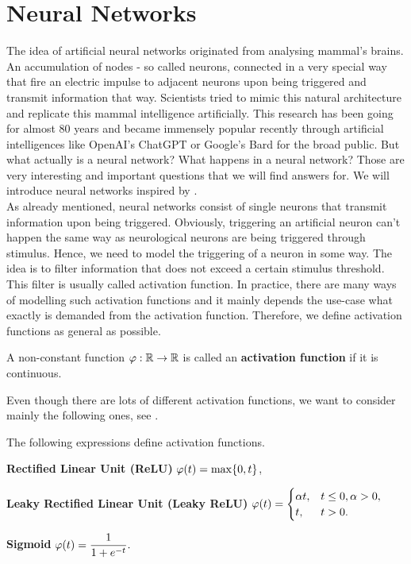 \section{Neural Networks}\label{sec:nn}
The idea of artificial neural networks originated from analysing mammal's brains. An accumulation of nodes - so called neurons, connected in a very special way that fire an electric impulse to adjacent neurons upon being triggered and transmit information that way. Scientists tried to mimic this natural architecture and replicate this mammal intelligence artificially. This research has been going for almost 80 years and became immensely popular recently through artificial intelligences like OpenAI's ChatGPT or Google's Bard for the broad public. But what actually is a neural network? What happens in a neural network? Those are very interesting and important questions that we will find answers for. We will introduce neural networks inspired by \cite[Chapter~3]{mucke2019empirical}.\\
 As already mentioned, neural networks consist of single neurons that transmit information upon being \glqq triggered\grqq{}. Obviously, triggering an artificial neuron can't happen the same way as neurological neurons are being triggered through stimulus. Hence, we need to model the triggering of a neuron in some way. The idea is to filter information that does not exceed a certain stimulus threshold. This filter is usually called activation function. In practice, there are many ways of modelling such activation functions and it mainly depends the use-case what exactly is demanded from the activation function. Therefore, we define activation functions as general as possible.

\begin{definition}
A non-constant function $\operatorname{\varphi}: \operatorname{\mathbb{R}} \to \operatorname{\mathbb{R}}$ is called an \textbf{activation function} if it is continuous.
\end{definition}


Even though there are lots of different activation functions, we want to consider mainly the following ones, see \cite[Chapter~6]{goodfellow2016deep}.


\begin{example}
The following expressions define activation functions.
\begin{mydescription}{}
\item[\textbf{Rectified Linear Unit (ReLU)}] $\operatorname{\varphi}(t) = \max\{0, t\}$,
\item[\textbf{Leaky Rectified Linear Unit (Leaky ReLU)}] $\displaystyle \operatorname{\varphi}(t) = \begin{cases}
\alpha t, 	& t \leq 0, \alpha>0,\\
t,		& t > 0.
\end{cases}$
\item[\textbf{Sigmoid}] $\displaystyle \operatorname{\varphi}(t) = \frac{1}{1 + e^{-t}}.$
\end{mydescription}
\end{example}


